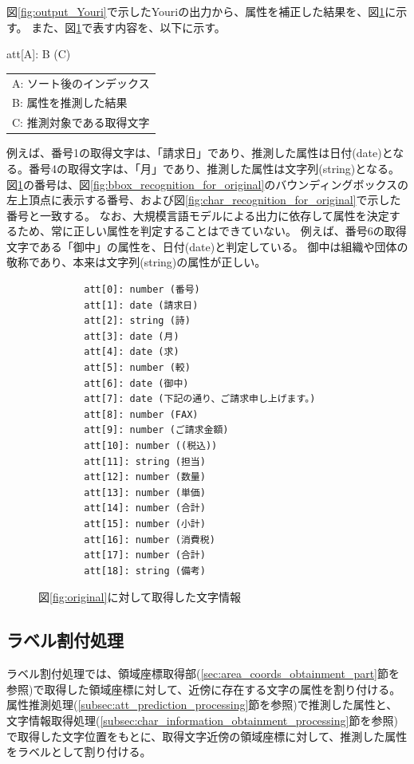 図\ref{fig:output_Youri}で示したYouriの出力から、属性を補正した結果を、図\ref{fig:predict_att_for_original}に示す。
また、図\ref{fig:predict_att_for_original}で表す内容を、以下に示す。

\begin{center}
    att[A]: B (C)
\end{center}

\begin{center}
    \begin{tabular}{l}
        A: ソート後のインデックス\\
        B: 属性を推測した結果\\
        C: 推測対象である取得文字\\
    \end{tabular}
\end{center}

例えば、番号1の取得文字は、「請求日」であり、推測した属性は日付(date)となる。番号4の取得文字は、「月」であり、推測した属性は文字列(string)となる。
図\ref{fig:predict_att_for_original}の番号は、図\ref{fig:bbox_recognition_for_original}のバウンディングボックスの左上頂点に表示する番号、および図\ref{fig:char_recognition_for_original}で示した番号と一致する。
なお、大規模言語モデルによる出力に依存して属性を決定するため、常に正しい属性を判定することはできていない。
例えば、番号6の取得文字である「御中」の属性を、日付(date)と判定している。
御中は組織や団体の敬称であり、本来は文字列(string)の属性が正しい。

\lstset{language=}
\begin{figure}[t]
    \begin{lstlisting}
        att[0]: number (番号)
        att[1]: date (請求日)
        att[2]: string (詩)
        att[3]: date (月)
        att[4]: date (求)
        att[5]: number (較)
        att[6]: date (御中)
        att[7]: date (下記の通り、ご請求申し上げます。)
        att[8]: number (FAX)
        att[9]: number (ご請求金額)
        att[10]: number ((税込))
        att[11]: string (担当)
        att[12]: number (数量)
        att[13]: number (単価)
        att[14]: number (合計)
        att[15]: number (小計)
        att[16]: number (消費税)
        att[17]: number (合計)
        att[18]: string (備考)
    \end{lstlisting}
    \caption{図\ref{fig:original}に対して取得した文字情報}
    \label{fig:predict_att_for_original}
\end{figure}

\subsection{ラベル割付処理}\label{subsec:label_link_processing}
ラベル割付処理では、領域座標取得部(\ref{sec:area_coords_obtainment_part}節を参照)で取得した領域座標に対して、近傍に存在する文字の属性を割り付ける。
属性推測処理(\ref{subsec:att_prediction_processing}節を参照)で推測した属性と、文字情報取得処理(\ref{subsec:char_information_obtainment_processing}節を参照)で取得した文字位置をもとに、取得文字近傍の領域座標に対して、推測した属性をラベルとして割り付ける。

